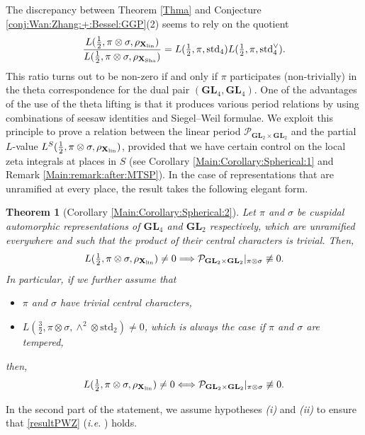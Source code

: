 \documentclass[11pt, reqno]{amsart}
\theoremstyle{plain}
\theoremstyle{definition}
\theoremstyle{remark}
\theoremstyle{plain}
\newtheorem{thmb}[thma]{Theorem}
\def\GL{\mathbf{GL}}
\begin{document}
 
 

The discrepancy between Theorem \ref{Thma} and Conjecture \ref{conj:Wan:Zhang:+:Bessel:GGP}(2) seems to rely on the quotient \begin{align}\label{eq_ref_discrepancy_spectral}
    \frac{L(\frac{1}{2},\pi \otimes \sigma,\rho_{\mathbf{X}_{\rm lin}})}{L(\frac{1}{2},\pi\otimes\sigma,\rho_{\mathbf{X}_{\rm Sha}})} = L(\tfrac{1}{2}, \pi , {\rm std}_4)L(\tfrac{1}{2}, \pi , {\rm std}_4^\vee).
\end{align}
This ratio turns out to be non-zero if and only if $\pi$ participates (non-trivially) in the theta correspondence for the dual pair $(\GL_4,\GL_4)$. One of the advantages of the use of the theta lifting is that it produces various period relations by using combinations of seesaw identities and Siegel--Weil formulae. We exploit this principle to prove a relation between the linear period $\mathcal{P}_{ \GL_2 \times \GL_2}$ and the partial $L$-value $L^S( \tfrac{1}{2}, \pi \otimes \sigma, \rho_{\mathbf{X}_{\rm lin}})$, provided that we have certain control on the local zeta integrals at places in $S$ (see Corollary \ref{Main:Corollary:Spherical:1} and Remark \ref{Main:remark:after:MTSP}). In the case of representations that are unramified at every place, the result takes the following elegant form. 

\begin{thmb}[{Corollary \ref{Main:Corollary:Spherical:2}}]\label{Thmb}
    Let $\pi$ and $\sigma$ be cuspidal automorphic representations of $\GL_4$ and $\GL_2$ respectively, which are unramified everywhere and such that the product of their central characters is trivial. Then,
    \[L( \tfrac{1}{2}, \pi \otimes \sigma, \rho_{\mathbf{X}_{\rm lin}}) \neq 0 \Longrightarrow {\mathcal{P}_{ \GL_2 \times \GL_2}}|_{\pi \otimes \sigma} \not \equiv 0.\] In particular, if we further assume that \begin{itemize}
        \item[(i)] $\pi$ and $\sigma$ have trivial central characters,
        \item[(ii)] $L(\frac{3}{2},\pi \otimes \sigma,\wedge^2\otimes\mathrm{std}_2)\neq 0$, which is always the case if $\pi$ and $\sigma$ are tempered,
    \end{itemize} then,
\[L( \tfrac{1}{2}, \pi \otimes \sigma, \rho_{\mathbf{X}_{\rm lin}}) \neq 0 \Longleftrightarrow {\mathcal{P}_{ \GL_2 \times \GL_2}}|_{\pi \otimes \sigma} \not \equiv 0.\]
\end{thmb}
 \noindent In the second part of the statement, we assume hypotheses \emph{(i)} and \emph{(ii)} to ensure that \eqref{resultPWZ} (\emph{i.e.} \cite[Corollary 1.3(6)]{Pollack:Wan:Zydor}) holds. 
 
\end{document}
